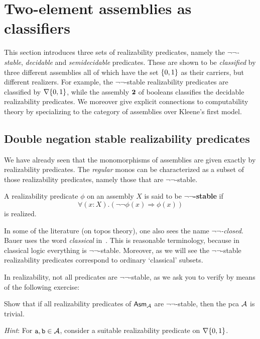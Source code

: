 \section{Two-element assemblies as classifiers}\label{sec:two-element-assemblies}

This section introduces three sets of realizability predicates, namely the
\emph{\(\lnot\lnot\)-stable}, \emph{decidable} and \emph{semidecidable}
predicates.
%
These are shown to be \emph{classified} by three different assemblies all of
which have the set \(\set{0,1}\) as their carriers, but different realizers.
%
For example, the \(\lnot\lnot\)-stable realizability predicates are classified
by \(\nabla\set{0,1}\), while the assembly \(\Two\) of booleans classifies the
decidable realizability predicates.
%
We moreover give explicit connections to computability theory by specializing to
the category of assemblies over Kleene's first model.

\subsection{Double negation stable realizability predicates}\label{sec:double-negation-stable}

We have already seen that the monomorphisms of assemblies are given exactly by
realizability predicates. The \emph{regular} monos can be characterized as a
subset of those realizability predicates, namely those that are
\(\lnot\lnot\)-stable.

\begin{definition}
  A realizability predicate \(\phi\) on an assembly \(X\) is said to be
  \textbf{\(\lnot\lnot\)-stable} if
  \[
    \forall(x : X).(\lnot\lnot\phi(x) \Rightarrow \phi(x))
  \]
  is realized.
\end{definition}

In some of the literature (on topos theory), one also sees the name
\emph{\(\lnot\lnot\)-closed}.
%
Bauer uses the word \emph{classical} in~\cite{Bauer2023}.
%
This is reasonable terminology, because in classical logic everything is
\(\lnot\lnot\)-stable. Moreover, as we will see the \(\lnot\lnot\)-stable
realizability predicates correspond to ordinary `classical' subsets.

In realizability, not all predicates are \(\lnot\lnot\)-stable, as we ask you to
verify by means of the following exercise:

\begin{exercise}\label{exer:not-double-negation-stable-predicate}
  Show that if all realizability predicates of \(\Asm{\AA}\) are
  \(\lnot\lnot\)-stable, then the pca \(\AA\) is trivial.

  \emph{Hint}: For \(\pca{a},\pca{b} \in \AA\), consider a suitable
  realizability predicate on \(\nabla\set{0,1}\).
\end{exercise}

